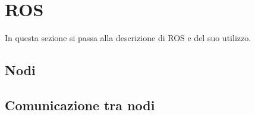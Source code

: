 \section{ROS}
In questa sezione si passa alla descrizione di ROS e del suo utilizzo.
\subsection{Nodi}
\subsection{Comunicazione tra nodi}
